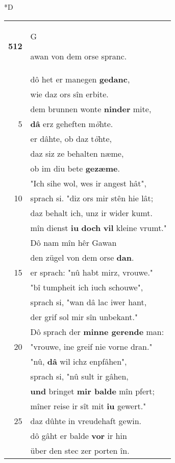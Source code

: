 \documentclass[8pt,a4paper,notitlepage]{article}
\begin{document}
\begin{table}[ht]
\begin{minipage}[t]{0.5\linewidth}
\small
\begin{center}*D
\end{center}
\begin{tabular}{rl}
\textbf{512} & \begin{large}G\end{large}awan von dem orse spranc.\\ 
 & dô het er manegen \textbf{gedanc},\\ 
 & wie daz ors sîn erbite.\\ 
 & dem brunnen wonte \textbf{ninder} mite,\\ 
5 & \textbf{dâ} erz geheften m\textit{ö}hte.\\ 
 & er dâhte, ob daz t\textit{ö}hte,\\ 
 & daz siz ze behalten næme,\\ 
 & ob im diu bete \textbf{gezæme}.\\ 
 & "Ich sihe wol, wes ir angest hât",\\ 
10 & sprach si. "diz ors mir stên hie lât;\\ 
 & daz behalt ich, unz ir wider kumt.\\ 
 & mîn dienst \textbf{iu} \textbf{doch} \textbf{vil} kleine vrumt."\\ 
 & Dô nam mîn hêr Gawan\\ 
 & den zügel von dem orse \textbf{dan}.\\ 
15 & er sprach: "nû habt mirz, vrouwe."\\ 
 & "bî tumpheit ich iuch schouwe",\\ 
 & sprach si, "wan dâ lac iwer hant,\\ 
 & der grif sol mir sîn unbekant."\\ 
 & Dô sprach der \textbf{minne gerende} man:\\ 
20 & "vrouwe, ine greif nie vorne dran."\\ 
 & "nû, \textbf{dâ} wil ichz enpfâhen",\\ 
 & sprach si, "nû sult ir gâhen,\\ 
 & \textbf{und} bringet \textbf{mir balde} mîn pfert;\\ 
 & mîner reise ir sît mit \textbf{iu} gewert."\\ 
25 & daz dûhte in vreudehaft gewin.\\ 
 & dô gâht er balde \textbf{vor} ir hin\\ 
 & über den stec zer porten în.\\ 

\end{tabular}
\end{minipage}
\end{table}
\end{document}
